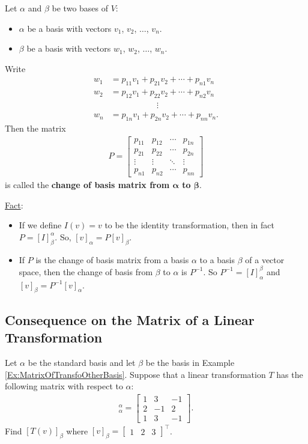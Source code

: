\documentclass[12pt,a4paper]{article}
\newcounter{example}[section]
\begin{document}
	Let $\alpha$ and $\beta$ be two bases of $V$:
		\begin{itemize}
		\item $\alpha$ be a basis with vectors $v_1$, $v_2$, $\ldots$, $v_n$.
		\item $\beta$ be a basis with vectors $w_1$, $w_2$, $\ldots$, $w_n$.
		\end{itemize}
	Write
		\begin{align*}
		w_1 &= p_{11} v_1 + p_{21} v_2 + \cdots + p_{n1} v_n \\
		w_2 &= p_{12} v_1 + p_{22} v_2 + \cdots + p_{n2} v_n \\
		& \phantom{22222222222} \vdots \\
		w_n &= p_{1n} v_1 + p_{2n} v_2 + \cdots + p_{nn} v_n .
		\end{align*}
	Then the matrix
		\begin{align*}
		P = \begin{bmatrix}
		p_{11} & p_{12} & \cdots & p_{1n} \\
		p_{21} & p_{22} & \cdots & p_{2n} \\
		\vdots & \vdots & \ddots & \vdots \\
		p_{n1} & p_{n2} & \cdots & p_{nn}
		\end{bmatrix}
		\end{align*}
	is called the \textbf{change of basis matrix from $\mathbf{\alpha}$ to $\mathbf{\beta}$}.
	
	\underline{Fact}: 
	\begin{itemize}
	\item If we define $I(v) = v$ to be the identity transformation, then in fact $P = [I]_{\beta}^\alpha$. So, $[v]_{\alpha} = P [v]_\beta$.
	\vfill
	\item If $P$ is the change of basis matrix from a basis $\alpha$ to a basis $\beta$ of a vector space, then the change of basis from $\beta$ to $\alpha$ is $P^{-1}$. So $P^{-1} = [I]_\alpha^\beta$ and $[v]_\beta = P^{-1} [v]_\alpha$.
	\end{itemize}
	
	\newpage	
	
	\subsection{Consequence on the Matrix of a Linear Transformation}
	
	\begin{example}
	Let $\alpha$ be the standard basis and let $\beta$ be the basis in Example \ref{Ex:MatrixOfTransfoOtherBasis}. Suppose that a linear transformation $T$ has the following matrix with respect to $\alpha$:
		\begin{align*}
		[T]_{\alpha}^\alpha = \begin{bmatrix}
		1 & 3 & -1 \\ 2 & -1 & 2 \\ 1 & 3 & -1
		\end{bmatrix} .
		\end{align*}
	Find $[T(v)]_{\beta}$ where $[v]_{\beta} = \begin{bmatrix} 1 & 2 & 3 \end{bmatrix}^\top$. 
	\end{example}
	
\end{document}
